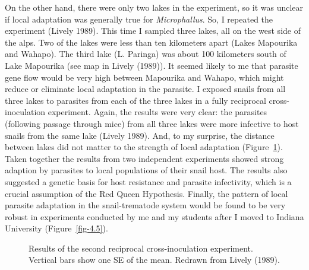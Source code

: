\documentclass[
  letterpaper,
]{book}
\begin{document}
On the other hand, there were only two lakes in the experiment, so it
was unclear if local adaptation was generally true for
\emph{Microphallus}. So, I repeated the experiment (Lively 1989). This
time I sampled three lakes, all on the west side of the alps. Two of the
lakes were less than ten kilometers apart (Lakes Mapourika and Wahapo).
The third lake (L. Paringa) was about 100 kilometers south of Lake
Mapourika (see map in Lively (1989)). It seemed likely to me that
parasite gene flow would be very high between Mapourika and Wahapo,
which might reduce or eliminate local adaptation in the parasite. I
exposed snails from all three lakes to parasites from each of the three
lakes in a fully reciprocal cross-inoculation experiment. Again, the
results were very clear: the parasites (following passage through mice)
from all three lakes were more infective to host snails from the same
lake (Lively 1989). And, to my surprise, the distance between lakes did
not matter to the strength of local adaptation (Figure~\ref{fig-4.4}).
Taken together the results from two independent experiments showed
strong adaption by parasites to local populations of their snail host.
The results also suggested a genetic basis for host resistance and
parasite infectivity, which is a crucial assumption of the Red Queen
Hypothesis. Finally, the pattern of local parasite adaptation in the
snail-trematode system would be found to be very robust in experiments
conducted by me and my students after I moved to Indiana University
(Figure~\ref{fig-4.5}).

\begin{figure}


\caption[Results of the second reciprocal cross-inoculation
experiment]{\label{fig-4.4}Results of the second reciprocal
cross-inoculation experiment. Vertical bars show one SE of the mean.
Redrawn from Lively (1989).}

\end{figure}%
\end{document}
